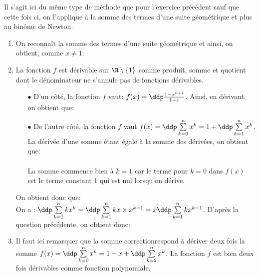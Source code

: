 
\begin{correction}  \; Il s'agit ici du m\^{e}me type de m\'ethode que pour l'exercice pr\'ec\'edent sauf que cette fois ci, on l'applique \`{a} la somme des termes d'une suite g\'eom\'etrique et plus au bin\^{o}me de Newton.
\begin{enumerate}
\item On reconna\^{i}t la somme des termes d'une suite g\'eom\'etrique et ainsi, on obtient, comme $x\not= 1$:\\
\noindent  {}
\item La fonction $f$ est d\'erivable sur $\R\setminus\lbrace 1\rbrace$ comme produit, somme et quotient dont le d\'enominateur ne s'annule pas de fonctions d\'erivables. 
\begin{itemize}
\item[$\bullet$] D'un c\^{o}t\'e, la fonction $f$ vaut: $f(x)=\ddp\frac{1-x^{n+1}}{1-x}$. Ainsi, en d\'erivant, on obtient que:\\
\noindent {}
\item[$\bullet$] De l'autre c\^{o}t\'e, la fonction $f$ vaut $f(x)=\ddp \sum\limits_{k=0}^{n} x^k=1+\ddp \sum\limits_{k=1}^{n} x^k$. La d\'eriv\'ee d'une somme \'etant \'egale \`{a} la somme des d\'eriv\'ees, on obtient que:\\
\noindent {} \\
\noindent \warning La somme commence bien \`{a} $k=1$ car le terme pour $k=0$ dans $f(x)$ est le terme constant $1$ qui est nul lorsqu'on d\'erive.
\end{itemize} 
On obtient donc que: \\
On a : $\ddp \sum\limits_{k=1}^{n} k x^{k}=\ddp \sum\limits_{k=1}^{n} k x\times x^{k-1}=x\ddp \sum\limits_{k=1}^{n} k x^{k-1}$. D'apr\`{e}s la question pr\'ec\'edente, on obtient donc:\begin{center}
\end{center}
\item Il faut ici remarquer que la somme correctionrespond \`{a} d\'eriver deux fois la somme $f(x)=\ddp \sum\limits_{k=0}^{n} x^k=1+x+\ddp \sum\limits_{k=2}^{n} x^k$. La fonction $f$ est bien deux fois d\'erivables comme fonction polynomiale.

\end{enumerate}
\end{correction}
